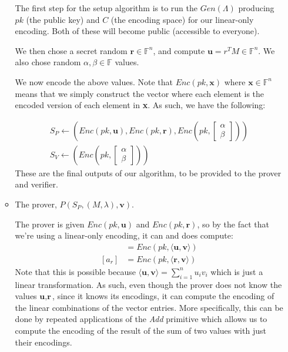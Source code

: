\documentclass[12pt]{exam}
\begin{document}
\begin{questions}
\begin{solution}
\begin{enumerate}[label=\textbf{\alph*.}]
\begin{itemize}
        The first step for the setup algorithm is to run the $\textit{Gen}(\Lambda)$ producing $pk$ (the public key) and $C$ (the encoding space) for our linear-only encoding. Both of these will become public (accessible to everyone).
        
        We then chose a secret random $\textbf{r} \in \mathbb{F}^n$, and compute $\textbf{u} = r^TM \in \mathbb{F}^n$. We also chose random $\alpha, \beta \in \mathbb{F}$ values. 

        We now encode the above values. Note that $\textit{Enc}(pk, \textbf{x})$ where $\textbf{x} \in \mathbb{F}^n$ means that we simply construct the vector where each element is the encoded version of each element in \textbf{x}. As such, we have the following:

        \begin{align*}
          S_P \leftarrow \left(\textit{Enc}(pk, \textbf{u}), \textit{Enc}(pk, \textbf{r}), \textit{Enc}\left(pk, \begin{bmatrix} \alpha \\ \beta \end{bmatrix}\right)\right) \\
          S_V \leftarrow \left( \textit{Enc}\left(pk, \begin{bmatrix} \alpha \\ \beta \end{bmatrix} \right) \right)
        \end{align*}
        These are the final outputs of our algorithm, to be provided to the prover and verifier.

      \item The prover, $P(S_P, (M, \lambda), \textbf{v})$.

      The prover is given $\textit{Enc}(pk, \textbf{u})$ and $\textit{Enc}(pk, \textbf{r})$, so by the fact that we're using a linear-only encoding, it can and does compute:
      \begin{align*}
        [a_u] &= \textit{Enc}(pk, \langle \textbf{u}, \textbf{v} \rangle) \\
        [a_r] &= \textit{Enc}(pk, \langle \textbf{r}, \textbf{v} \rangle)
      \end{align*}
      Note that this is possible because $\langle \textbf{u}, \textbf{v} \rangle = \sum_{i=1}^n u_i v_i$ which is just a linear transformation. As such, even though the prover does not know the values $\textbf{u}, \textbf{r}$, since it knows its encodings, it can compute the encoding of the linear combinations of the vector entries. More specifically, this can be done by repeated applications of the \textit{Add} primitive which allows us to compute the encoding of the result of the sum of two values with just their encodings.


\end{itemize}
\end{enumerate}
\end{solution}
\end{questions}
\end{document}
